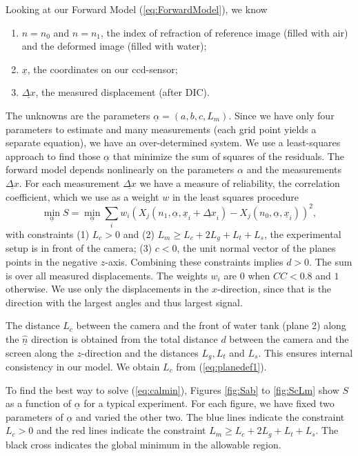 \documentclass[smallextended]{svjour3}       %
\begin{document}
Looking at our Forward Model (\ref{eq:ForwardModel}), we know
\begin{enumerate}
	\item $n=n_0$ and $n=n_1$, the index of refraction of reference image (filled with air) and the deformed image (filled with water); 
	\item $\underline{x}$, the coordinates on our ccd-sensor; 
	\item $\underline{\Delta x}$, the measured displacement (after DIC). 
\end{enumerate}
The unknowns are the parameters $\underline{\alpha} = (a, b, c, L_m)$. Since we have only four parameters to estimate and many measurements (each grid point yields a separate equation), we have an over-determined system. We use a least-squares approach to find those $\underline{\alpha}$ that minimize the sum of squares of the residuals. The forward model depends nonlinearly on the parameters $\alpha$ and the measurements $\underline{\Delta x}$. For each measurement $\underline{\Delta x}$ we have a measure of reliability, the correlation coefficient, which we use as a weight $w$ in the least squares procedure
\begin{equation}
\label{eq:calmin} 
\min_{\underline{\alpha}}  S = \min_{\underline{\alpha}} \sum_i w_i \left(X_{j}(n_1, \underline{\alpha}, \underline{x}_i+\underline{\Delta x}_i) - X_{j}(n_0, \underline{\alpha}, \underline{x}_i)\right)^2, 
\end{equation}
with constraints (1) $L_c > 0$ and (2) $L_m \geq L_c + 2 L_g + L_t + L_s$, the experimental setup is in front of the camera; (3) $c < 0$, the unit normal vector of the planes points in the negative $z$-axis. Combining these constraints implies $d>0$. The sum is over all measured displacements. The weights $w_i$ are $0$ when $CC < 0.8$ and $1$ otherwise. We use only the displacements in the $x$-direction, since that is the direction with the largest angles and thus largest signal.

The distance $L_c$ between the camera and the front of water tank (plane 2) along the $\underline{\hat{n}}$ direction is obtained from the total distance $d$ between the camera and the screen along the $z$-direction and the distances $L_g, L_t$ and $L_s$. This ensures internal consistency in our model. We obtain $L_c$ from (\ref{eq:planedef1}).

To find the best way to solve (\ref{eq:calmin}), Figures \ref{fig:Sab} to \ref{fig:ScLm} show $S$ as a function of $\underline{\alpha}$ for a typical experiment. For each figure, we have fixed two parameters of $\underline{\alpha}$ and varied the other two. The blue lines indicate the constraint $L_c >0$ and the red lines indicate the constraint $L_m \geq L_c + 2 L_g + L_t + L_s$. The black cross indicates the global minimum in the allowable region.
\end{document}
